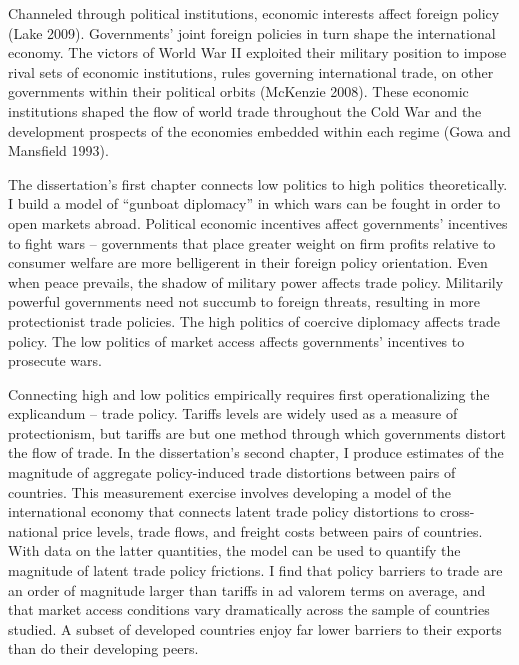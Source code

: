 \documentclass{puthesis}
\begin{document}
Channeled through political institutions, economic interests affect
foreign policy (Lake 2009). Governments' joint foreign policies in turn
shape the international economy. The victors of World War II exploited
their military position to impose rival sets of economic institutions,
rules governing international trade, on other governments within their
political orbits (McKenzie 2008). These economic institutions shaped the
flow of world trade throughout the Cold War and the development
prospects of the economies embedded within each regime (Gowa and
Mansfield 1993).

The dissertation's first chapter connects low politics to high politics
theoretically. I build a model of ``gunboat diplomacy'' in which wars
can be fought in order to open markets abroad. Political economic
incentives affect governments' incentives to fight wars -- governments
that place greater weight on firm profits relative to consumer welfare
are more belligerent in their foreign policy orientation. Even when
peace prevails, the shadow of military power affects trade policy.
Militarily powerful governments need not succumb to foreign threats,
resulting in more protectionist trade policies. The high politics of
coercive diplomacy affects trade policy. The low politics of market
access affects governments' incentives to prosecute wars.

Connecting high and low politics empirically requires first
operationalizing the explicandum -- trade policy. Tariffs levels are
widely used as a measure of protectionism, but tariffs are but one
method through which governments distort the flow of trade. In the
dissertation's second chapter, I produce estimates of the magnitude of
aggregate policy-induced trade distortions between pairs of countries.
This measurement exercise involves developing a model of the
international economy that connects latent trade policy distortions to
cross-national price levels, trade flows, and freight costs between
pairs of countries. With data on the latter quantities, the model can be
used to quantify the magnitude of latent trade policy frictions. I find
that policy barriers to trade are an order of magnitude larger than
tariffs in ad valorem terms on average, and that market access
conditions vary dramatically across the sample of countries studied. A
subset of developed countries enjoy far lower barriers to their exports
than do their developing peers.
\end{document}
